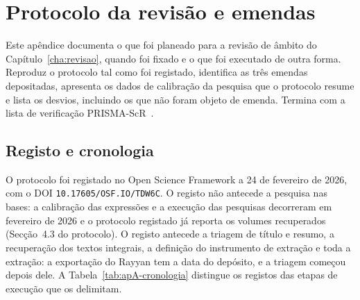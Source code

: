 \chapter{Protocolo da revisão e emendas}
\label{app:protocolo-sr}

Este apêndice documenta o que foi planeado para a revisão de âmbito do Capítulo~\ref{cha:revisao}, quando foi fixado e o que foi executado de outra forma. Reproduz o protocolo tal como foi registado, identifica as três emendas depositadas, apresenta os dados de calibração da pesquisa que o protocolo resume e lista os desvios, incluindo os que não foram objeto de emenda. Termina com a lista de verificação PRISMA-ScR~\cite{Tricco2018}.

\section{Registo e cronologia}
\label{sec:apA-cronologia}

O protocolo foi registado no Open Science Framework a 24 de fevereiro de 2026, com o DOI \nolinkurl{10.17605/OSF.IO/TDW6C}. O registo não antecede a pesquisa nas bases: a calibração das expressões e a execução das pesquisas decorreram em fevereiro de 2026 e o protocolo registado já reporta os volumes recuperados (Secção~4.3 do protocolo). O registo antecede a triagem de título e resumo, a recuperação dos textos integrais, a definição do instrumento de extração e toda a extração: a exportação do Rayyan tem a data do depósito, e a triagem começou depois dele. A Tabela~\ref{tab:apA-cronologia} distingue os registos das etapas de execução que os delimitam.

